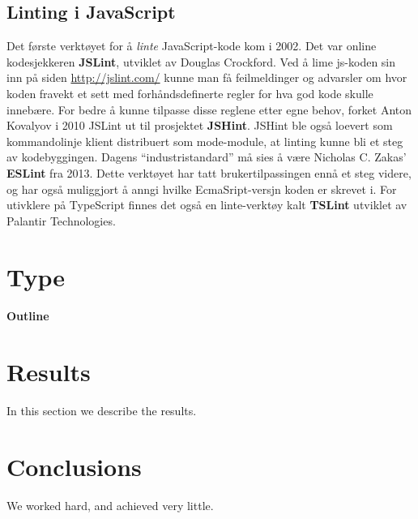 \documentclass[12pt,norsk,a4enc per]{article}
\begin{document}
\subsection{Linting i JavaScript}

Det første verktøyet for å \textit{linte} JavaScript-kode kom i 2002. Det var
online kodesjekkeren \textbf{JSLint}, utviklet av Douglas Crockford. Ved å lime
js-koden sin inn på siden \underline{http://jslint.com/} kunne man få
feilmeldinger og advarsler om hvor koden fravekt et sett med forhåndsdefinerte
regler for hva god kode skulle innebære. For bedre å kunne tilpasse disse
reglene etter egne behov, forket Anton Kovalyov i 2010 JSLint ut til prosjektet
\textbf{JSHint}. JSHint ble også loevert som kommandolinje klient distribuert
som mode-module, at linting kunne bli et steg av kodebyggingen. Dagens
``industristandard'' må sies å være Nicholas C. Zakas' \textbf{ESLint} fra 2013.
Dette verktøyet har tatt brukertilpassingen ennå et steg videre, og har også
muliggjort å anngi hvilke EcmaSript-versjn koden er skrevet i. For utivklere på
TypeScript finnes det også en linte-verktøy kalt \textbf{TSLint} utviklet av
Palantir Technologies.




\section{Type}





\paragraph{Outline}


\section{Results}\label{results}
In this section we describe the results.

\section{Conclusions}\label{conclusions}
We worked hard, and achieved very little.
\end{document}
